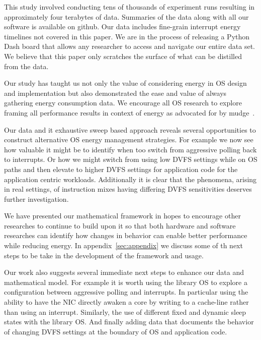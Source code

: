 \label{sec:dis}
This study involved conducting tens of thousands of experiment runs resulting in approximately four terabytes of data.  Summaries of the data along with all our software is available on github.  Our data includes fine-grain interrupt energy timelines not covered in this paper.  We are in the process of releasing a Python Dash board that allows any researcher to access and navigate our entire data set.  We believe that this paper only scratches the surface of what can be distilled from the data.

Our study has taught us not only the value of considering energy in OS design and implementation but also demonstrated the ease and value of always gathering energy consumption data.  We encourage all OS research to explore framing all performance results in context of energy as advocated for by mudge~\cite{917539}.

Our data and it exhaustive sweep based approach reveals several opportunities to construct alternative OS energy management strategies.  For example we now see how valuable it might be to identify when too switch from aggressive polling back to interrupts.  Or how we might switch from using low DVFS settings while on OS paths and then elevate to higher DVFS settings for application code for the application centric workloads.  Additionally it is clear that the phenomena, arising in real settings, of instruction mixes having differing DVFS sensitivities deserves further investigation. 

We have presented our mathematical framework in hopes to encourage other researches to continue to build upon it so that both hardware and software researches can identify how changes in behavior can enable better performance while reducing energy.  In appendix~\ref{sec:appendix} we discuss some of th next steps to be take in the development of the framework and usage. 

Our work also suggests several immediate next steps to enhance our data and mathematical model.  For example it is worth using the library OS to explore a configuration between aggressive polling and interrupts.  In particular using the ability to have the NIC directly awaken a core by writing to a cache-line rather than using an interrupt.   Similarly, the use of different fixed and dynamic sleep states with the library OS.   And finally adding data that documents the behavior of changing DVFS settings at the boundary of OS and application code.  


